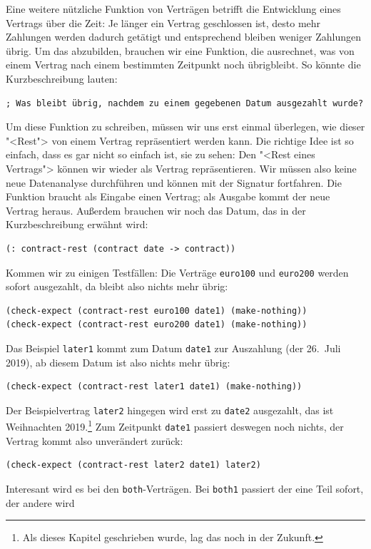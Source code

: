 Eine weitere nützliche Funktion von Verträgen betrifft die Entwicklung
eines Vertrags über die Zeit: Je länger ein Vertrag geschlossen ist,
desto mehr Zahlungen werden dadurch getätigt und entsprechend bleiben
weniger Zahlungen übrig.  Um das abzubilden, brauchen wir eine
Funktion, die ausrechnet, was von einem Vertrag nach einem bestimmten
Zeitpunkt noch übrigbleibt.  So könnte die Kurzbeschreibung lauten:
%
\begin{lstlisting}
; Was bleibt übrig, nachdem zu einem gegebenen Datum ausgezahlt wurde?
\end{lstlisting}
%
Um diese Funktion zu schreiben, müssen wir uns erst einmal überlegen,
wie dieser "<Rest"> von einem Vertrag repräsentiert werden kann.  Die
richtige Idee ist so einfach, dass es gar nicht so einfach ist, sie zu
sehen: Den "<Rest eines Vertrags"> können wir wieder als Vertrag
repräsentieren.  Wir müssen also keine neue Datenanalyse durchführen
und können mit der Signatur fortfahren.  Die Funktion braucht als
Eingabe einen Vertrag; als Ausgabe kommt der neue Vertrag heraus.
Außerdem brauchen wir noch das Datum, das in der Kurzbeschreibung
erwähnt wird:
%
\begin{lstlisting}
(: contract-rest (contract date -> contract))
\end{lstlisting}
%
Kommen wir zu einigen Testfällen: Die Verträge \lstinline{euro100} und
\lstinline{euro200} werden sofort ausgezahlt, da bleibt also nichts
mehr übrig:
%
\begin{lstlisting}
(check-expect (contract-rest euro100 date1) (make-nothing))
(check-expect (contract-rest euro200 date1) (make-nothing))
\end{lstlisting}
%
Das Beispiel \lstinline{later1} kommt zum Datum \lstinline{date1} zur
Auszahlung (der 26.~Juli 2019), ab diesem Datum ist also nichts mehr
übrig:
%
\begin{lstlisting}
(check-expect (contract-rest later1 date1) (make-nothing))
\end{lstlisting}
%
Der Beispielvertrag \lstinline{later2} hingegen wird erst zu
\lstinline{date2} ausgezahlt, das ist Weihnachten 2019.\footnote{Als
  dieses Kapitel geschrieben wurde, lag das noch in der Zukunft.}  Zum Zeitpunkt
\lstinline{date1} passiert deswegen noch nichts, der Vertrag
kommt also unverändert zurück:
%
\begin{lstlisting}
(check-expect (contract-rest later2 date1) later2)
\end{lstlisting}
%
Interesant wird es bei den \lstinline{both}-Verträgen.  Bei
\lstinline{both1} passiert der eine Teil sofort, der andere wird
